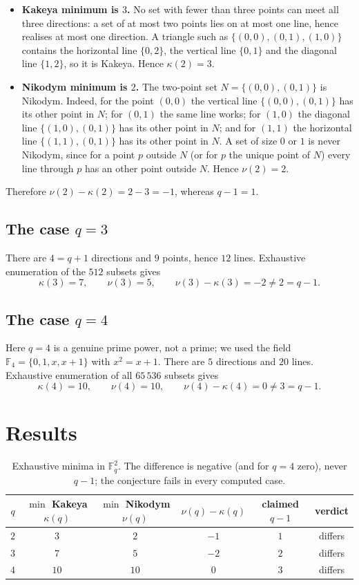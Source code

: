 \documentclass[11pt]{article}
\theoremstyle{definition}
\theoremstyle{remark}
\begin{document}
\begin{itemize}
\item \textbf{Kakeya minimum is $3$.} No set with fewer than three points can
meet all three directions: a set of at most two points lies on at most one
line, hence realises at most one direction. A triangle such as
$\{(0,0),(0,1),(1,0)\}$ contains the horizontal line $\{0,2\}$, the vertical
line $\{0,1\}$ and the diagonal line $\{1,2\}$, so it is Kakeya. Hence
$\kappa(2)=3$.
\item \textbf{Nikodym minimum is $2$.} The two-point set
$N=\{(0,0),(0,1)\}$ is Nikodym. Indeed, for the point $(0,0)$ the vertical line
$\{(0,0),(0,1)\}$ has its other point in $N$; for $(0,1)$ the same line works;
for $(1,0)$ the diagonal line $\{(1,0),(0,1)\}$ has its other point in $N$; and
for $(1,1)$ the horizontal line $\{(1,1),(0,1)\}$ has its other point in $N$.
A set of size $0$ or $1$ is never Nikodym, since for a point $p$ outside $N$ (or
for $p$ the unique point of $N$) every line through $p$ has an other point
outside $N$. Hence $\nu(2)=2$.
\end{itemize}

Therefore $\nu(2)-\kappa(2)=2-3=-1$, whereas $q-1=1$.

\subsection{The case $q=3$}

There are $4=q+1$ directions and $9$ points, hence $12$ lines. Exhaustive
enumeration of the $512$ subsets gives
\[
  \kappa(3)=7,\qquad \nu(3)=5,\qquad \nu(3)-\kappa(3)=-2\neq 2=q-1 .
\]

\subsection{The case $q=4$}

Here $q=4$ is a genuine prime power, not a prime; we used the field
$\mathbb{F}_4=\{0,1,x,x+1\}$ with $x^2=x+1$. There are $5$ directions and $20$
lines. Exhaustive enumeration of all $65\,536$ subsets gives
\[
  \kappa(4)=10,\qquad \nu(4)=10,\qquad \nu(4)-\kappa(4)=0\neq 3=q-1 .
\]

\section{Results}

\begin{table}[ht]
\centering
\begin{tabular}{cccccc}
\toprule
$q$ & $\min$ Kakeya $\kappa(q)$ & $\min$ Nikodym $\nu(q)$ &
$\nu(q)-\kappa(q)$ & claimed $q-1$ & verdict \\
\midrule
$2$ & $3$  & $2$  & $-1$ & $1$ & differs \\
$3$ & $7$  & $5$  & $-2$ & $2$ & differs \\
$4$ & $10$ & $10$ & $0$  & $3$ & differs \\
\bottomrule
\end{tabular}
\caption{Exhaustive minima in $\mathbb{F}_q^2$. The difference is negative
(and for $q=4$ zero), never $q-1$; the conjecture fails in every computed
case.}
\label{tab:results}
\end{table}
\end{document}
